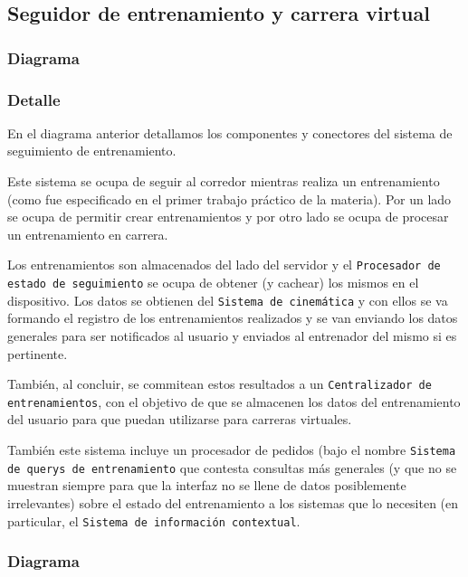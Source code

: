 \subsection{Seguidor de entrenamiento y carrera virtual}
\subsubsection{Diagrama}


\subsubsection{Detalle}

En el diagrama anterior detallamos los componentes y conectores del
sistema de seguimiento de entrenamiento. 

Este sistema se ocupa de seguir al corredor mientras realiza un 
entrenamiento (como fue especificado en el primer trabajo práctico
de la materia). Por un lado se ocupa de permitir crear entrenamientos
y por otro lado se ocupa de procesar un entrenamiento en carrera.

Los entrenamientos son almacenados del lado del servidor y el
\texttt{Procesador de estado de seguimiento} se ocupa de obtener
(y cachear) los mismos en el dispositivo. Los datos se obtienen del
\texttt{Sistema de cinemática} y con ellos se va formando el registro
de los entrenamientos realizados y se van enviando los datos 
generales para ser notificados al usuario y enviados al entrenador del
mismo si es pertinente.

También, al concluir, se commitean estos resultados a un 
\texttt{Centralizador de entrenamientos}, con el objetivo de que 
se almacenen los datos del entrenamiento del usuario para que 
puedan utilizarse para carreras virtuales.

También este sistema incluye un procesador de pedidos (bajo el nombre
\texttt{Sistema de querys de entrenamiento} que contesta consultas
más generales (y que no se muestran siempre para que la interfaz no
se llene de datos posiblemente irrelevantes) sobre el estado del
entrenamiento a los sistemas que lo necesiten (en particular, el
\texttt{Sistema de información contextual}.

\subsubsection{Diagrama}

